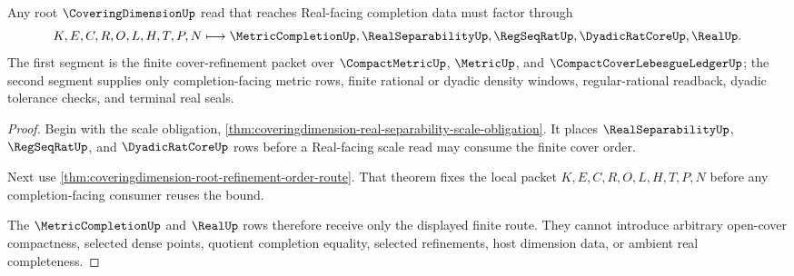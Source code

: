 \begin{theorem}
\label{thm:coveringdimension-root-real-separability-completion-route}
Any root $\CoveringDimensionUp$ read that reaches Real-facing completion data must factor through
$$
K,E,C,R,O,L,H,T,P,N
\longmapsto
\MetricCompletionUp,\RealSeparabilityUp,\RegSeqRatUp,\DyadicRatCoreUp,\RealUp .
$$
The first segment is the finite cover-refinement packet over $\CompactMetricUp$, $\MetricUp$, and $\CompactCoverLebesgueLedgerUp$; the second segment supplies only completion-facing metric rows, finite rational or dyadic density windows, regular-rational readback, dyadic tolerance checks, and terminal real seals.
\end{theorem}
\begin{proof}
Begin with the scale obligation, \autoref{thm:coveringdimension-real-separability-scale-obligation}. It places $\RealSeparabilityUp$, $\RegSeqRatUp$, and $\DyadicRatCoreUp$ rows before a Real-facing scale read may consume the finite cover order.

Next use \autoref{thm:coveringdimension-root-refinement-order-route}. That theorem fixes the local packet $K,E,C,R,O,L,H,T,P,N$ before any completion-facing consumer reuses the bound.

The $\MetricCompletionUp$ and $\RealUp$ rows therefore receive only the displayed finite route. They cannot introduce arbitrary open-cover compactness, selected dense points, quotient completion equality, selected refinements, host dimension data, or ambient real completeness.
\end{proof}

